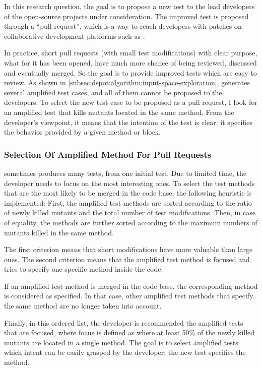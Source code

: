 In this research question, the goal is to propose a new test to the lead developers of the open-source projects under consideration. 
The improved test is proposed through a ``pull-request'', which is a way to reach developers with patches on collaborative development platforms such as \gh.

In practice, short pull requests (\ie with small test modifications) with clear purpose, \ie what for it has been opened, have much more chance of being reviewed, discussed and eventually merged. 
So the goal is to provide improved tests which are easy to review.
As shown in \autoref{subsec:dspot:algorithm:input-space-exploration}, \dspot generates several amplified test cases, and all of them cannot be proposed to the developers.
To select the new test case to be proposed as a pull request, I look for an amplified test that kills mutants located in the same method.
From the developer's viewpoint, it means that the intention of the test is clear: it specifies the behavior provided by a given method or block.

\subsubsection{Selection Of Amplified Method For Pull Requests}
\label{subsubsec:test-improvement:experiment-results:rq1:selection}

\dspot sometimes produces many tests, from one initial test.
Due to limited time, the developer needs to focus on the most interesting ones.
To select the test methods that are the most likely to be merged in the code base, the following heuristic is implemented:
First, the amplified test methods are sorted according to the ratio of newly killed mutants and the total number of test modifications.
Then, in case of equality, the methods are further sorted according to the maximum numbers of mutants killed in the same method.

The first criterion means that short modifications have more valuable than large ones.
The second criterion means that the amplified test method is focused and tries to specify one specific method inside the code.

If an amplified test method is merged in the code base, the corresponding method is considered as specified. 
In that case, other amplified test methods that specify the same method are no longer taken into account.

Finally, in this ordered list, the developer is recommended the amplified tests that are focused, where focus is defined as where at least 50\% of the newly killed mutants are located in a single method. 
The goal is to select amplified tests which intent can be easily grasped by the developer: the new test specifies the method.

